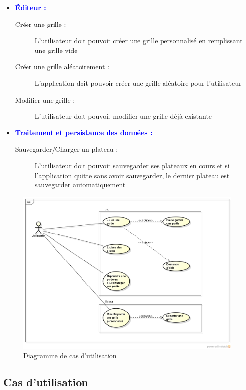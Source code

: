 \documentclass[a4paper, 12pt, twoside]{article}
\begin{document}
\begin{itemize}
 \item[\textbullet] \textbf{\textcolor{blue}{\'Editeur : }}
 \begin{description}
    \item[Créer une grille :] L'utilisateur doit pouvoir créer une grille personnalisé en remplissant une grille vide
    \item[Créer une grille aléatoirement :] L'application doit pouvoir créer une grille aléatoire pour l'utilisateur
    \item[Modifier une grille :] L'utilisateur doit pouvoir modifier une grille déjà existante
  \end{description}
  
  \item[\textbullet] \textbf{\textcolor{blue}{Traitement et persistance des données : }}
 \begin{description}
    \item[Sauvegarder/Charger un plateau :] L'utilisateur doit pouvoir sauvegarder ses plateaux en cours et si l'application quitte sans avoir sauvegarder, le dernier plateau est sauvegarder automatiquement
  \end{description}
\end{itemize}

\begin{figure}[ht]
  \center
  \includegraphics[scale=0.50]{CasUt.png}
  \caption{Diagramme de cas d'utilisation}
  \label{diagCU}
\end{figure}

\subsection{Cas d'utilisation} %
\end{document}
